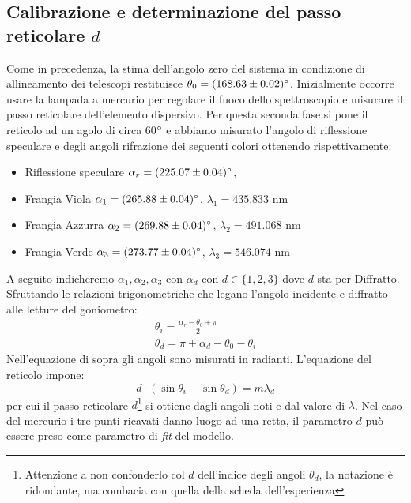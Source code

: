 \documentclass[10pt,a4paper]{article}
\begin{document}
	\subsection*{Calibrazione e determinazione del passo reticolare $d$}
		Come in precedenza, la stima dell'angolo zero del sistema in condizione di allineamento dei telescopi restituisce $\theta_{0} = (168.63 \pm 0.02)\degree$.
		Inizialmente occorre usare la lampada a mercurio per regolare il fuoco dello spettroscopio e misurare il passo reticolare dell'elemento dispersivo. Per questa seconda fase si pone il reticolo ad un agolo di circa 60$\degree$ e abbiamo misurato l'angolo di riflessione speculare e degli angoli rifrazione dei seguenti colori ottenendo rispettivamente:
		\begin{itemize}
		    \item Riflessione speculare $\alpha_{r} = (225.07 \pm 0.04 )\degree$, 
		    \item Frangia Viola $\alpha_{1}= (265.88\pm0.04)\degree$, $\lambda_1 = 435.833 \textrm{ nm}$
		    \item Frangia Azzurra $\alpha_{2}= (269.88\pm0.04)\degree$, $\lambda_2 = 491.068 \textrm{ nm}$
		    \item Frangia Verde $\alpha_{3} = (273.77 \pm 0.04)\degree$, $\lambda_3 = 546.074 \textrm{ nm}$
		\end{itemize}
		A seguito indicheremo $\alpha_{1},\alpha_2,\alpha_3$ con $\alpha_d$ con $d\in\{1,2,3\}$ dove $d$ sta per Diffratto.\newline
		Sfruttando le relazioni trigonometriche che legano l'angolo incidente e diffratto alle letture del goniometro:
		\begin{gather}
		    \theta_{i} = \frac{\alpha_r-\theta_0+\pi}2\\
		    \theta_{d} = \pi + \alpha_d  - \theta_0 - \theta_i
		\end{gather}
		Nell'equazione di sopra gli angoli sono misurati in radianti.
		L'equazione del reticolo impone:
		\begin{equation}
			d\cdot(\sin\theta_{i} - \sin\theta_{d}) = m\lambda_d
			\label{eq:principale}
		\end{equation}
		per cui il passo reticolare $d$\footnote{Attenzione a non confonderlo col $d$ dell'indice degli angoli $\theta_d$, la notazione è ridondante, ma combacia con quella della scheda dell'esperienza} si ottiene dagli angoli noti e dal valore di $\lambda$. Nel caso del mercurio i tre punti ricavati danno luogo ad una retta, il parametro $d$ può essere preso come parametro di \textit{fit} del modello.\newline
\end{document}

